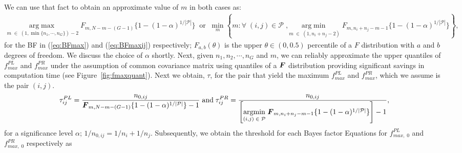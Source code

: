\documentclass[times,sort&compress,3p]{elsarticle}
\theoremstyle{plain}%
\theoremstyle{definition}
\def\be{\begin{eqnarray}}
\def\ee{\end{eqnarray}}
\newcommand{\uF}       {\mbox{\boldmath$F$}}
\newcommand{\ugamma}            {\mbox{\boldmath$\gamma$}}
\begin{document}
We can use that fact to obtain an approximate value of $m$ in both cases as:
\be
 \underset{m\; \in\; (1, \min\{n_1, \cdots,n_{G}\})-2}{\mathrm{arg\max}}\; F_{m, N -m -(G-1)}\{1-(1 - \alpha)^{1/|\mathcal{P}|}\}\;\; \mbox{or}\;\; \underset{m}{\mathrm{\min}} \left\{m:\forall\;(i,j) \in\mathcal{P}\;,  \underset{m\; \in \;(1, n_i+n_{j}-2)}{\mathrm{arg\min}}\; F_{m, n_i+n_j -m -1}\{1 - (1 - \alpha)^{1/|\mathcal{P}|}\} \right\}, \label{eq:mval} 
 \ee
for the BF in (\ref{eq:BFmax}) and (\ref{eq:BFmaxij}) respectively; $F_{a, b}(\theta)$ is the upper $\theta \in (0, 0.5)$ percentile of a $F$ distribution with $a$ and $b$ degrees of freedom. We discuss the choice of $\alpha$ shortly.
Next, given $n_1,n_2, \cdots, n_{G}$ and $m$, we can reliably approximate the upper quantiles of $f^{PL}_{max}$ and $f^{PR}_{max}$ under the assumption of common covariance matrix using quantiles of a $\uF$ distribution providing significant savings in computation time (see Figure~\ref{fig:fmaxquant}). Next we obtain, $\tau$, for the pair that yield the maximum $f^{PL}_{max}$ and $f^{PR}_{max}$, which we assume is the pair $(i, j)$.
\be
\tau^{PL}_{ij} = \frac{n_{0,ij}}{\uF_{m, N -m -(G-1)}\{1-(1-\alpha)^{1/|\mathcal{P}|}\} - 1}\; \mbox{and}\; \tau^{PR}_{ij} = \frac{n_{0,ij}}{\left[\underset{(i,j)\; \in\; \mathcal{P}}{\mathrm{argmin}}\; \uF_{m, n_{i}+n_{j} -m -1}\{1-(1-\alpha)^{1/|\mathcal{P}|}\}\right] - 1} , \label{eq:tau0}
\ee
for a significance level $\alpha$;  $1/n_{0,ij} = 1/n_{i} + 1/n_{j}$. %
Subsequently, we obtain the threshold for each Bayes factor Equations for $f^{PL}_{max,\;0}$ and $f^{PR}_{max,\;0}$ respectively as
\end{document}
